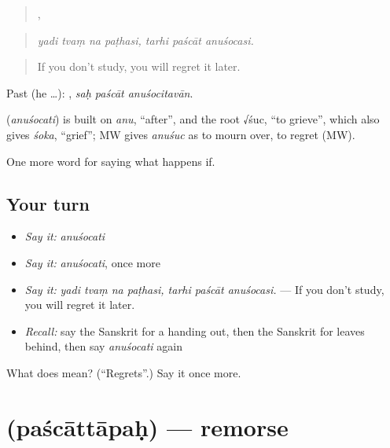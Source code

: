 \begin{quote}
   ,   
\end{quote}

\begin{quote}
\emph{yadi tvaṃ na paṭhasi, tarhi paścāt anuśocasi.}
\end{quote}

\begin{quote}
If you don't study, you will regret it later.
\end{quote}

Past (he …):   , \emph{saḥ paścāt anuśocitavān}.

\begin{cousinweb}
\textbf{} (\emph{anuśocati}) is built on \emph{anu}, \textquotedblleft{}after\textquotedblright{}, and the root √śuc, \textquotedblleft{}to grieve\textquotedblright{}, which also gives \emph{śoka}, \textquotedblleft{}grief\textquotedblright{}; MW gives \emph{anuśuc} as to mourn over, to regret (MW).
\end{cousinweb}

\begin{grammarlens}[title={What you've built}]
One more word for saying what happens if.
\end{grammarlens}

\subsection*{Your turn}
\begin{itemize}
\raggedright
  \item \emph{Say it:} \emph{anuśocati}
  \item \emph{Say it:} \emph{anuśocati}, once more
  \item \emph{Say it:} \emph{yadi tvaṃ na paṭhasi, tarhi paścāt anuśocasi.} — If you don't study, you will regret it later.
  \item \emph{Recall:} say the Sanskrit for a handing out, then the Sanskrit for leaves behind, then say \emph{anuśocati} again
\end{itemize}

\begin{tcolorbox}[breakable,colback=teal!4,colframe=teal!35!black,title={Before you move on}]
What does  mean? (\textquotedblleft{}Regrets\textquotedblright{}.) Say it once more.
\end{tcolorbox}
\section[\texorpdfstring{\sk{पश्चात्तापः} (paścāttāpaḥ)}{पश्चात्तापः (paścāttāpaḥ)}]{ (paścāttāpaḥ) — remorse}

